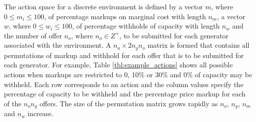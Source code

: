 The action space for a discrete environment is defined by a vector $m$, where
$0 \leq m_i \leq 100$, of percentage markups on marginal cost with length
$n_m$, a vector $w$, where $0 \leq w_i \leq 100$, of percentage withholds of
capacity with length $n_w$ and the number of offer $n_o$, where $n_o \in Z^+$,
to be submitted for each generator associated with the environment.  A $n_a
\times 2n_gn_o$ matrix is formed that contains all permutations of markup and
withhold for each offer that is to be submitted for each generator.  For
example, Table \ref{tbl:example_actions} shows all possible actions when
markups are restricted to 0, 10\% or 30\% and 0\% of capacity may be withheld.
Each row corresponds to an action and the column values specify the percentage
of capacity to be withheld and the percentage price markup for each of the
$n_on_g$ offers.  The size of the permutation matrix grows rapidly as $n_o$,
$n_g$, $n_m$ and $n_w$ increase.

%

